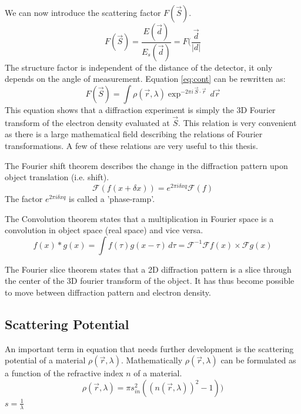 We can now introduce the scattering factor $F(\vec{S})$.
\begin{equation}
F(\vec{S}) = \frac{E(\vec{d})}{E_s(\vec{d})} = F(\frac{\vec{d}}{|d|}
\end{equation}
The structure factor is independent of the distance of the detector, it only depends on the angle of measurement. Equation \ref{eq:cont} can be rewritten as:
\begin{equation}\label{eq:diff_equation}
F(\vec{S}) = \int \rho(\vec{r},\lambda) \exp^{-2\pi i \,\vec{S} \cdot \vec{r}}\,d\vec{r}
\end{equation}
This equation shows that a diffraction experiment is simply the 3D Fourier transform of the electron density evaluated at $\vec{S}$. This relation is very convenient as there is a large mathematical field describing the relations of Fourier transformations. A few of these relations are very useful to this thesis.

The Fourier shift theorem describes the change in the diffraction pattern upon object translation (i.e. shift).
\begin{equation}
\mathcal{F}(f(x+\delta x))=e^{2\pi i \delta x q} \mathcal{F}(f)
\end{equation}
The factor $e^{2 \pi i \delta x q}$ is called a 'phase-ramp'.

The Convolution theorem states that a multiplication in Fourier space is a convolution in object space (real space) and vice versa.
\begin{equation}
f(x) * g(x) = \int f(\tau)g(x-\tau)\,d\tau = \mathcal{F}^{-1} {\mathcal{F}f(x)\times\mathcal{F}g(x)}
\end{equation}

The Fourier slice theorem states that a 2D diffraction pattern is a slice through the center of the 3D fourier transform of the object.
It has thus become possible to move between diffraction pattern and electron density.


\subsection{Scattering Potential}
An important term in equation that needs further development is the scattering potential of a material $\rho(\vec{r},\lambda)$. Mathematically $\rho(\vec{r},\lambda)$ can be formulated as a function of the refractive index $n$ of a material.
\begin{equation}
\rho(\vec{r},\lambda) = \pi s_{in}^2 (( n(\vec{r},\lambda))^2 -1))
\end{equation}
$s = \frac{1}{\lambda}$

